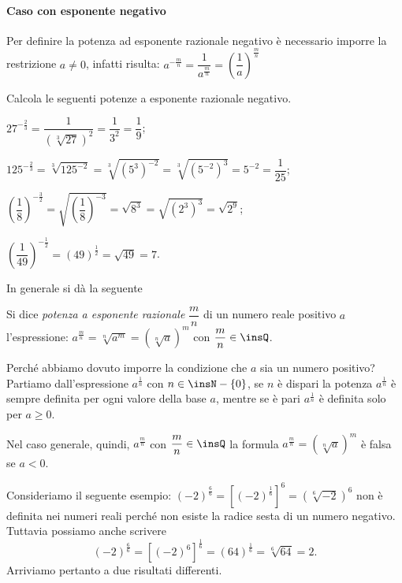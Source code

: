 \paragraph{Caso con esponente negativo}
Per definire la potenza ad esponente razionale negativo è necessario imporre la restrizione $a \neq 0$, infatti risulta:
$a^{-\frac{m}{n}}=\dfrac{1}{a^{\frac{m}{n}}}=\left(\dfrac{1}{a}\right)^{\frac{m}{n}}$

\begin{exrig}
\begin{esempio}
 Calcola le seguenti potenze a esponente razionale negativo.
 \begin{itemize*}
 \item $27^{-\frac{2}{3}}=\dfrac 1{\left(\sqrt[3]{27}\right)^2}=\dfrac 1{3^2}=\dfrac 1 9$;
 \item $125^{-\frac 2 3}=\sqrt[3]{125^{-2}}=\sqrt[3]{(5^3)^{-2}}=\sqrt[3]{(5^{-2})^3}=5^{-2}=\dfrac 1{25}$;
 \item $\left(\dfrac 1 8\right)^{-\frac 3 2}=\sqrt{\left(\dfrac 1 8\right)^{-3}}=\sqrt{8^3}=\sqrt{(2^3)^3}=\sqrt{2^9}$;
 \item $\left(\dfrac 1{49}\right)^{-\frac 1 2}=(49)^{\frac 1 2}=\sqrt{49}=7$.
\end{itemize*}
\end{esempio}
\end{exrig}

In generale si dà la seguente
\begin{definizione}
Si dice \emph{potenza a esponente razionale} $\dfrac{m}{n}$ di un numero reale positivo $a$ l'espressione:
 $a^{\frac{m}{n}}=\sqrt[n]{a^m}=\left(\sqrt[n]{a}\right)^m$ con $\dfrac{m}{n}\in \insQ$.
\end{definizione}

Perché abbiamo dovuto imporre la condizione che $a$ sia un numero positivo?
Partiamo dall'espressione $a^{\frac{1}{n}}$ con $n\in \insN-\{0\}$, se $n$ è dispari la potenza $a^{\frac{1}{n}}$ è sempre definita per ogni valore della base $a$, mentre se è pari $a^{\frac{1}{n}}$ è definita solo per $a\geq 0$.

Nel caso generale, quindi, $a^{\frac{m}{n}}$ con $\dfrac{m}{n}\in \insQ$ la formula $a^{\frac{m}{n}}=\left(\sqrt[n]{a}\right)^m$ è falsa se $a<0$.

Consideriamo il seguente esempio:
 $(-2)^{\frac 6 6}=\left[(-2)^{\frac 1 6}\right]^6=\left(\sqrt[6]{-2}\right)^6$ non è definita nei numeri reali perché non esiste la radice sesta di un numero negativo.
Tuttavia possiamo anche scrivere 
\[(-2)^{\frac 6 6}=\left[(-2)^6\right]^{\frac 1 6}=(64)^{\frac 1 6}=\sqrt[6]{64}=2.\]
Arriviamo pertanto a due risultati differenti.

